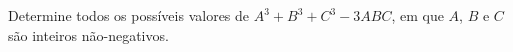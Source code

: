 Determine todos os possíveis valores de $A^3+B^3+C^3-3ABC$, em que $A$, $B$ e $C$ são inteiros não-negativos.
